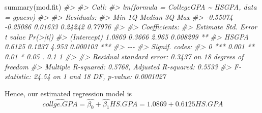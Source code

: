 \documentclass[
]{book}
\newenvironment{Shaded}{\begin{snugshade}}{\end{snugshade}}
\newcommand{\CommentTok}[1]{\textcolor[rgb]{0.56,0.35,0.01}{\textit{#1}}}
\newcommand{\FunctionTok}[1]{\textcolor[rgb]{0.00,0.00,0.00}{#1}}
\newcommand{\NormalTok}[1]{#1}
\begin{document}
\begin{Shaded}
\begin{Highlighting}[]
\FunctionTok{summary}\NormalTok{(mod.fit)}
\CommentTok{\#\textgreater{} }
\CommentTok{\#\textgreater{} Call:}
\CommentTok{\#\textgreater{} lm(formula = CollegeGPA \textasciitilde{} HSGPA, data = gpacsv)}
\CommentTok{\#\textgreater{} }
\CommentTok{\#\textgreater{} Residuals:}
\CommentTok{\#\textgreater{}      Min       1Q   Median       3Q      Max }
\CommentTok{\#\textgreater{} {-}0.55074 {-}0.25086  0.01633  0.24242  0.77976 }
\CommentTok{\#\textgreater{} }
\CommentTok{\#\textgreater{} Coefficients:}
\CommentTok{\#\textgreater{}             Estimate Std. Error t value Pr(\textgreater{}|t|)    }
\CommentTok{\#\textgreater{} (Intercept)   1.0869     0.3666   2.965 0.008299 ** }
\CommentTok{\#\textgreater{} HSGPA         0.6125     0.1237   4.953 0.000103 ***}
\CommentTok{\#\textgreater{} {-}{-}{-}}
\CommentTok{\#\textgreater{} Signif. codes:  }
\CommentTok{\#\textgreater{} 0 \textquotesingle{}***\textquotesingle{} 0.001 \textquotesingle{}**\textquotesingle{} 0.01 \textquotesingle{}*\textquotesingle{} 0.05 \textquotesingle{}.\textquotesingle{} 0.1 \textquotesingle{} \textquotesingle{} 1}
\CommentTok{\#\textgreater{} }
\CommentTok{\#\textgreater{} Residual standard error: 0.3437 on 18 degrees of freedom}
\CommentTok{\#\textgreater{} Multiple R{-}squared:  0.5768, Adjusted R{-}squared:  0.5533 }
\CommentTok{\#\textgreater{} F{-}statistic: 24.54 on 1 and 18 DF,  p{-}value: 0.0001027}
\end{Highlighting}
\end{Shaded}

Hence, our estimated regression model is\[ \hat{collge.GPA}=\hat{\beta_0}+\hat{\beta_1}HS.GPA
=1.0869+0.6125HS.GPA\]
\end{document}
